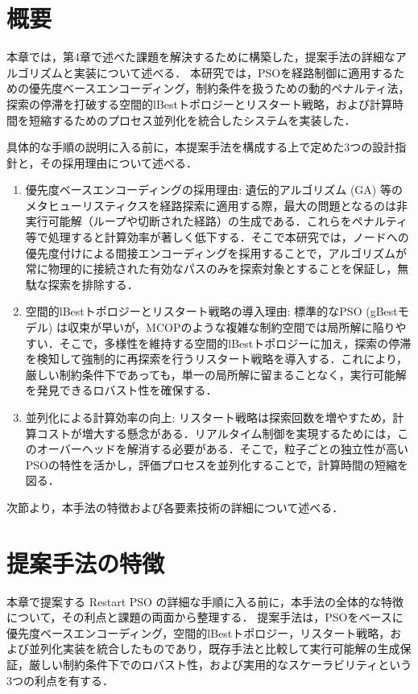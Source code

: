 
\section{概要}
本章では，第4章で述べた課題を解決するために構築した，提案手法の詳細なアルゴリズムと実装について述べる．
本研究では，PSOを経路制御に適用するための優先度ベースエンコーディング，制約条件を扱うための動的ペナルティ法，探索の停滞を打破する空間的lBestトポロジーとリスタート戦略，および計算時間を短縮するためのプロセス並列化を統合したシステムを実装した．

具体的な手順の説明に入る前に，本提案手法を構成する上で定めた3つの設計指針と，その採用理由について述べる．

\begin{enumerate}
    \item {優先度ベースエンコーディングの採用理由}:
    遺伝的アルゴリズム (GA) 等のメタヒューリスティクスを経路探索に適用する際，最大の問題となるのは非実行可能解（ループや切断された経路）の生成である．これらをペナルティ等で処理すると計算効率が著しく低下する．そこで本研究では，ノードへの優先度付けによる間接エンコーディングを採用することで，アルゴリズムが常に物理的に接続された有効なパスのみを探索対象とすることを保証し，無駄な探索を排除する．

    \item {空間的lBestトポロジーとリスタート戦略の導入理由}:
    標準的なPSO (gBestモデル) は収束が早いが，MCOPのような複雑な制約空間では局所解に陥りやすい．そこで，多様性を維持する空間的lBestトポロジーに加え，探索の停滞を検知して強制的に再探索を行うリスタート戦略を導入する．これにより，厳しい制約条件下であっても，単一の局所解に留まることなく，実行可能解を発見できるロバスト性を確保する．

    \item {並列化による計算効率の向上}:
    リスタート戦略は探索回数を増やすため，計算コストが増大する懸念がある．リアルタイム制御を実現するためには，このオーバーヘッドを解消する必要がある．そこで，粒子ごとの独立性が高いPSOの特性を活かし，評価プロセスを並列化することで，計算時間の短縮を図る．
\end{enumerate}

次節より，本手法の特徴および各要素技術の詳細について述べる．

\section{提案手法の特徴}
本章で提案する Restart PSO の詳細な手順に入る前に，本手法の全体的な特徴について，その利点と課題の両面から整理する．
提案手法は，PSOをベースに優先度ベースエンコーディング，空間的lBestトポロジー，リスタート戦略，および並列化実装を統合したものであり，既存手法と比較して実行可能解の生成保証，厳しい制約条件下でのロバスト性，および実用的なスケーラビリティという3つの利点を有する．

